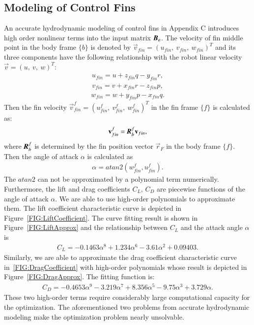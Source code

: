 \subsection{Modeling of Control Fins}
An accurate hydrodynamic modeling of control fins in Appendix C introduces high order nonlinear terms into the input matrix $\emph{\textbf{B}}_{a}$. The velocity of fin middle point in the body frame $\lbrace b \rbrace$ is denoted by $\vec{v}_{fin}=(u_{fin},~v_{fin},~w_{fin})^{T}$ and its three components have the following relationship with the robot linear velocity $\vec{v}=(u,~v,~w)^{T}$: 
\begin{align}
u_{fin}=u+z_{fin}q-y_{fin}r,
\end{align}
\begin{align}
v_{fin}=v+x_{fin}r-z_{fin}p,
\end{align}
\begin{align}
w_{fin}=w+y_{fin}p-x_{fin}q.
\end{align}
Then the fin velocity $\vec{v}_{fin}^{f}=(u_{fin}^{f},~v_{fin}^{f},~w_{fin}^{f})^{T}$ in the fin frame $\lbrace f \rbrace$ is calculated as:
\begin{align}
\vec{v}_{fin}^{f}=\emph{\textbf{R}}_{b}^{f}\vec{v}_{fin},
\end{align}
where $\emph{\textbf{R}}_{b}^{f}$ is determined by the fin position vector $\vec{r}_{F}$ in the body frame $\lbrace f \rbrace$. Then the angle of attack $\alpha$ is calculated as
\begin{align}
\alpha=atan2(w_{fin}^{f},u_{fin}^{f}).
\end{align} 
The $atan2$ can not be approximated by a polynomial term numerically. Furthermore, the lift and drag coefficients $C_{L}$, $C_{D}$ are piecewise functions of the angle of attack $\alpha$. We are able to use high-order polynomials to approximate them. The lift coefficient characteristic curve is depicted in Figure~\ref{FIG:LiftCoefficient}. The curve fitting result is shown in Figure~\ref{FIG:LiftApprox} and the relationship between $C_{L}$ and the attack angle $\alpha$ is
\begin{align}
C_{L}=-0.1463\alpha^{8}+1.234\alpha^{6}-3.61\alpha^{2}+0.09403.
\end{align}
Similarly, we are able to approximate the drag coefficient characteristic curve in~\ref{FIG:DragCoefficient} with high-order polynomials whose result is depicted in Figure~\ref{FIG:DragApprox}. The fitting function is:
\begin{align}
C_{D}=-0.4653\alpha^{9}-3.219\alpha^{7}+8.356\alpha^{5}-9.75\alpha^{3}+3.729\alpha.
\end{align}
These two high-order terms require considerably large computational capacity for the optimization. The aforementioned two problems from accurate hydrodynamic modeling make the optimization problem nearly unsolvable.

